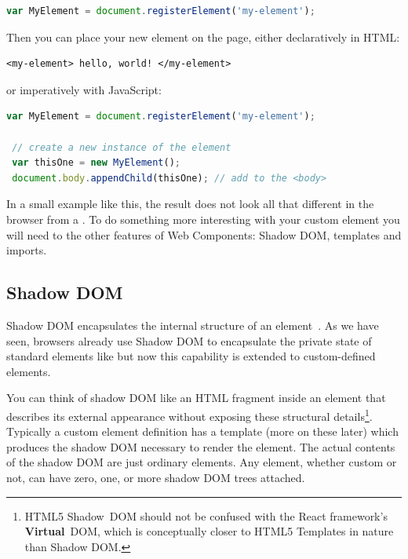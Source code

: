 \begin{lstlisting}[language=JavaScript,numbers=none]
 var MyElement = document.registerElement('my-element');
\end{lstlisting}

Then you can place your new element on the page, either declaratively in HTML:

\begin{lstlisting}[language=HTML5,numbers=none]
 <my-element> hello, world! </my-element>
\end{lstlisting}

or imperatively with JavaScript:

\begin{lstlisting}[language=JavaScript,caption={Registering a custom element\index{Custom Elements} in JavaScript\index{JavaScript}.},label=l:register]
 var MyElement = document.registerElement('my-element');

 // create a new instance of the element
 var thisOne = new MyElement();      
 document.body.appendChild(thisOne); // add to the <body>
\end{lstlisting}

In a small example like this, the result does not look all that different in the browser from a .
To do something more interesting with your custom element you will need to the other features of Web Components: Shadow DOM, templates and imports.

\subsection{Shadow DOM}
\label{bg:shadowdom}
Shadow DOM encapsulates the internal structure of an element~\cite{w3ccontributors2015}. 
As we have seen, browsers already use Shadow DOM to encapsulate the private state of standard elements like  but now this capability is extended to custom-defined elements.

You can think of shadow DOM like an HTML fragment inside an element that describes its external appearance without exposing these structural details\footnote{
HTML5 Shadow~DOM should not be confused with the React framework's \textbf{Virtual}~DOM, which is conceptually closer to HTML5 Templates in nature than Shadow DOM.}. 
Typically a custom element definition has a template (more on these later) which produces the shadow DOM necessary to render the element.
The actual contents of the shadow DOM are just ordinary elements.
Any element, whether custom or not, can have zero, one, or more shadow DOM trees attached.

